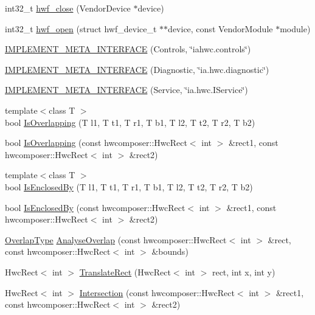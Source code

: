 \begin{DoxyCompactItemize}
\item 
int32\+\_\+t \mbox{\hyperlink{namespacehwcomposer_a63478f90a6b0dbbd556b8ba0aad962c4}{hwf\+\_\+close}} (Vendor\+Device $\ast$device)
\item 
int32\+\_\+t \mbox{\hyperlink{namespacehwcomposer_a758867c4aa2dca920b8764c3407f5bf6}{hwf\+\_\+open}} (struct hwf\+\_\+device\+\_\+t $\ast$$\ast$device, const Vendor\+Module $\ast$module)
\item 
\mbox{\hyperlink{namespacehwcomposer_a82a803ccd8a4200f613493cb90ee18a5}{I\+M\+P\+L\+E\+M\+E\+N\+T\+\_\+\+M\+E\+T\+A\+\_\+\+I\+N\+T\+E\+R\+F\+A\+CE}} (Controls, \char`\"{}iahwc.\+controls\char`\"{})
\item 
\mbox{\hyperlink{namespacehwcomposer_a70386172dd94f7ce97b779f66e777fac}{I\+M\+P\+L\+E\+M\+E\+N\+T\+\_\+\+M\+E\+T\+A\+\_\+\+I\+N\+T\+E\+R\+F\+A\+CE}} (Diagnostic, \char`\"{}ia.\+hwc.\+diagnostic\char`\"{})
\item 
\mbox{\hyperlink{namespacehwcomposer_a07b7869833191ab7c62d4e5014f2efb8}{I\+M\+P\+L\+E\+M\+E\+N\+T\+\_\+\+M\+E\+T\+A\+\_\+\+I\+N\+T\+E\+R\+F\+A\+CE}} (Service, \char`\"{}ia.\+hwc.\+I\+Service\char`\"{})
\item 
{\footnotesize template$<$class T $>$ }\\bool \mbox{\hyperlink{namespacehwcomposer_aacb31a29f15f941c42d008129d00f9d0}{Is\+Overlapping}} (T l1, T t1, T r1, T b1, T l2, T t2, T r2, T b2)
\item 
bool \mbox{\hyperlink{namespacehwcomposer_a85ee8afdfd9f51ed3dc5bae812bd6876}{Is\+Overlapping}} (const hwcomposer\+::\+Hwc\+Rect$<$ int $>$ \&rect1, const hwcomposer\+::\+Hwc\+Rect$<$ int $>$ \&rect2)
\item 
{\footnotesize template$<$class T $>$ }\\bool \mbox{\hyperlink{namespacehwcomposer_a32be7e41379debbd179fcd96a99a2afa}{Is\+Enclosed\+By}} (T l1, T t1, T r1, T b1, T l2, T t2, T r2, T b2)
\item 
bool \mbox{\hyperlink{namespacehwcomposer_aee52dc2c0c8c0bbcd39530e880634de0}{Is\+Enclosed\+By}} (const hwcomposer\+::\+Hwc\+Rect$<$ int $>$ \&rect1, const hwcomposer\+::\+Hwc\+Rect$<$ int $>$ \&rect2)
\item 
\mbox{\hyperlink{namespacehwcomposer_a343d36a60de234fac01fc5982b8d0e38}{Overlap\+Type}} \mbox{\hyperlink{namespacehwcomposer_a2775b56090a031398e48a7b77b1dee05}{Analyse\+Overlap}} (const hwcomposer\+::\+Hwc\+Rect$<$ int $>$ \&rect, const hwcomposer\+::\+Hwc\+Rect$<$ int $>$ \&bounds)
\item 
Hwc\+Rect$<$ int $>$ \mbox{\hyperlink{namespacehwcomposer_ac60601bf8e2068d963dbbf172e08a317}{Translate\+Rect}} (Hwc\+Rect$<$ int $>$ rect, int x, int y)
\item 
Hwc\+Rect$<$ int $>$ \mbox{\hyperlink{namespacehwcomposer_a7e2b9700821805cf321089445e486447}{Intersection}} (const hwcomposer\+::\+Hwc\+Rect$<$ int $>$ \&rect1, const hwcomposer\+::\+Hwc\+Rect$<$ int $>$ \&rect2)
\end{DoxyCompactItemize}
